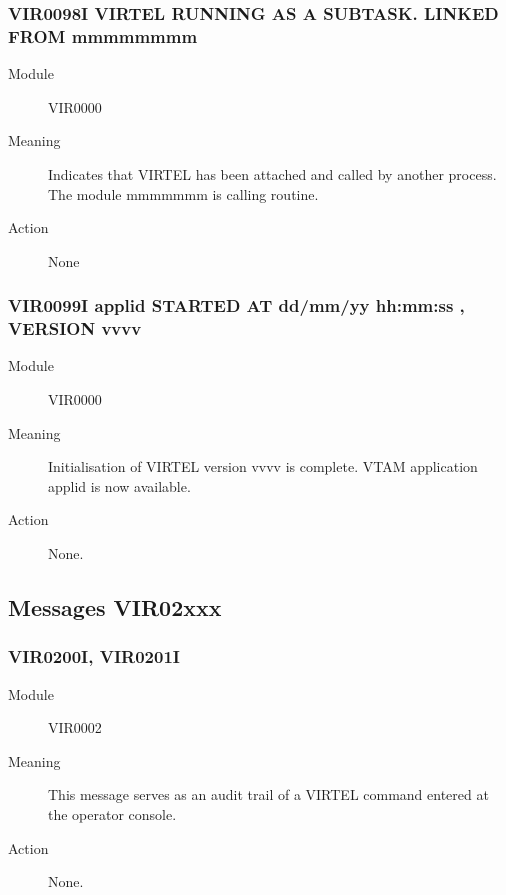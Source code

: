 \documentclass[letterpaper,10pt,english]{sphinxmanual}
\begin{document}
\subsubsection{VIR0098I VIRTEL RUNNING AS A SUBTASK. LINKED FROM mmmmmmmm}
\label{\detokenize{messages:vir0098i-virtel-running-as-a-subtask-linked-from-mmmmmmmm}}\begin{description}
\item[{Module}] \leavevmode
VIR0000

\item[{Meaning}] \leavevmode
Indicates that VIRTEL has been attached and called by another process. The module mmmmmmm is calling routine.

\item[{Action}] \leavevmode
None

\end{description}


\subsubsection{VIR0099I applid STARTED AT dd/mm/yy hh:mm:ss , VERSION vvvv}
\label{\detokenize{messages:vir0099i-applid-started-at-dd-mm-yy-hh-mm-ss-version-vvvv}}\begin{description}
\item[{Module}] \leavevmode
VIR0000

\item[{Meaning}] \leavevmode
Initialisation of VIRTEL version vvvv is complete. VTAM application applid is now available.

\item[{Action}] \leavevmode
None.

\end{description}


\subsection{Messages VIR02xxx}
\label{\detokenize{messages:messages-vir02xxx}}

\subsubsection{VIR0200I, VIR0201I}
\label{\detokenize{messages:vir0200i-vir0201i}}\begin{description}
\item[{Module}] \leavevmode
VIR0002

\item[{Meaning}] \leavevmode
This message serves as an audit trail of a VIRTEL command entered at the operator console.

\item[{Action}] \leavevmode
None.

\end{description}
\end{document}
